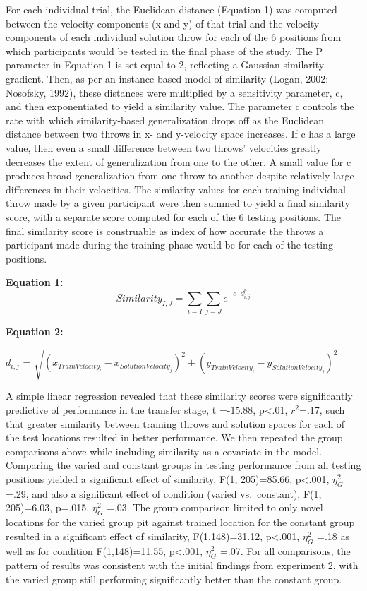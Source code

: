 \documentclass[
  man,floatsintext]{apa7}
\begin{document}
For each individual trial, the Euclidean distance (Equation 1) was computed between the velocity components (x and y) of that trial and the velocity components of each individual solution throw for each of the 6 positions from which participants would be tested in the final phase of the study. The P parameter in Equation 1 is set equal to 2, reflecting a Gaussian similarity gradient. Then, as per an instance-based model of similarity (Logan, 2002; Nosofsky, 1992), these distances were multiplied by a sensitivity parameter, c, and then exponentiated to yield a similarity value. The parameter c controls the rate with which similarity-based generalization drops off as the Euclidean distance between two throws in x- and y-velocity space increases. If c has a large value, then even a small difference between two throws' velocities greatly decreases the extent of generalization from one to the other. A small value for c produces broad generalization from one throw to another despite relatively large differences in their velocities. The similarity values for each training individual throw made by a given participant were then summed to yield a final similarity score, with a separate score computed for each of the 6 testing positions. The final similarity score is construable as index of how accurate the throws a participant made during the training phase would be for each of the testing positions.

\textbf{Equation 1:}
\[ Similarity_{I,J} =  \sum_{i = I}\sum_{j=J} e^{-c\cdot d^p_{i,j}} \]

\textbf{Equation 2:}

\(d_{i,j}\) = \(\sqrt{(x_{TrainVelocity_i}-x_{SolutionVelocity_j})^2 + (y_{TrainVelocity_i}-y_{SolutionVelocity_j})^2 }\)

A simple linear regression revealed that these similarity scores were significantly predictive of performance in the transfer stage, t =-15.88, p\textless.01, \(r^2\)=.17, such that greater similarity between training throws and solution spaces for each of the test locations resulted in better performance. We then repeated the group comparisons above while including similarity as a covariate in the model. Comparing the varied and constant groups in testing performance from all testing positions yielded a significant effect of similarity, F(1, 205)=85.66, p\textless.001, \(\eta^{2}_G\) =.29, and also a significant effect of condition (varied vs.~constant), F(1, 205)=6.03, p=.015, \(\eta^{2}_G\) =.03. The group comparison limited to only novel locations for the varied group pit against trained location for the constant group resulted in a significant effect of similarity, F(1,148)=31.12, p\textless.001, \(\eta^{2}_G\) =.18 as well as for condition F(1,148)=11.55, p\textless.001, \(\eta^{2}_G\) =.07. For all comparisons, the pattern of results was consistent with the initial findings from experiment 2, with the varied group still performing significantly better than the constant group.
\end{document}
